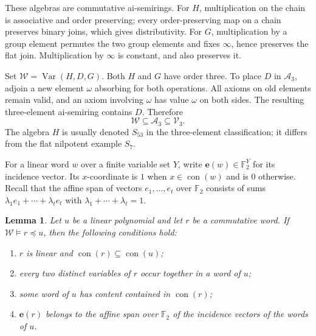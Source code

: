 \documentclass[11pt,reqno]{amsart}
\numberwithin{equation}{section}
\newtheorem{lemma}[theorem]{Lemma}
\theoremstyle{definition}
\theoremstyle{remark}
\DeclareMathOperator{\Var}{Var}
\DeclareMathOperator{\con}{con}
\newcommand{\Vthree}{\mathcal V_3}
\newcommand{\Athree}{\mathcal A_3}
\newcommand{\W}{\mathcal W}
\newcommand{\F}{\mathbb F_2}
\newcommand{\ivec}[1]{\mathbf e(#1)}
\begin{document}
These algebras are commutative ai-semirings. For $H$, multiplication
on the chain is associative and order preserving; every order-preserving
map on a chain preserves binary joins, which gives distributivity.
For $G$, multiplication by a group element permutes the two group
elements and fixes $\infty$, hence preserves the flat join. Multiplication
by $\infty$ is constant, and also preserves it.

Set $\W=\Var(H,D,G)$. Both $H$ and $G$ have order three.
To place $D$ in $\Athree$, adjoin a new element $\omega$ absorbing
for both operations. All axioms on old elements remain valid, and an
axiom involving $\omega$ has value $\omega$ on both sides. The resulting
three-element ai-semiring contains $D$. Therefore
\begin{equation}\label{eq:testsinside}
\W\subseteq\Athree\subseteq\Vthree.
\end{equation}
The algebra $H$ is usually denoted $S_{53}$ in the three-element
classification; it differs from the flat nilpotent example $S_7$.

For a linear word $w$ over a finite variable set $Y$, write
$\ivec{w}\in\F^Y$ for its incidence vector. Its $x$-coordinate is $1$
when $x\in\con(w)$ and is $0$ otherwise. Recall that the affine span
of vectors $e_1,\ldots,e_t$ over $\F$ consists of sums
$\lambda_1e_1+\cdots+\lambda_te_t$ with
$\lambda_1+\cdots+\lambda_t=1$.

\begin{lemma}\label{lem:tests}
Let $u$ be a linear polynomial and let $r$ be a commutative word.
If $\W\models r\preceq u$, then the following conditions hold:
\begin{enumerate}
\item $r$ is linear and $\con(r)\subseteq\con(u)$;
\item every two distinct variables of $r$ occur together in a word of $u$;
\item some word of $u$ has content contained in $\con(r)$;
\item $\ivec{r}$ belongs to the affine span over $\F$ of the incidence
vectors of the words of $u$.
\end{enumerate}
\end{lemma}
\end{document}
